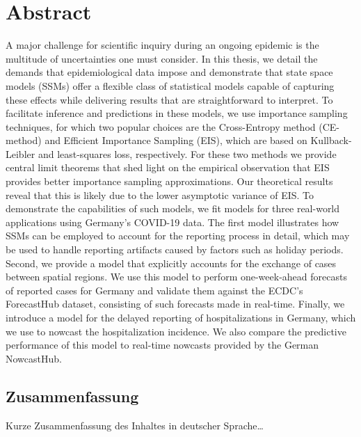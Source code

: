 \begingroup
\let\clearpage\relax
\let\cleardoublepage\relax
\let\cleardoublepage\relax

\chapter*{Abstract}
A major challenge for scientific inquiry during an ongoing epidemic is the multitude of uncertainties one must consider. 
In this thesis, we detail the demands that epidemiological data impose and demonstrate that state space models (SSMs) offer a flexible class of statistical models capable of capturing these effects while delivering results that are straightforward to interpret. 
To facilitate inference and predictions in these models, we use importance sampling techniques, for which two popular choices are the Cross-Entropy method (CE-method) and Efficient Importance Sampling (EIS), which are based on Kullback-Leibler and least-squares loss, respectively. For these two methods we provide central limit theorems that shed light on the empirical observation that EIS provides better importance sampling approximations. Our theoretical results reveal that this is likely due to the lower asymptotic variance of EIS. 
To demonstrate the capabilities of such models, we fit models for three real-world applications using Germany's COVID-19 data. 
The first model illustrates how SSMs can be employed to account for the reporting process in detail, which may be used to handle reporting artifacts caused by factors such as holiday periods.
Second, we provide a model that explicitly accounts for the exchange of cases between spatial regions. We use this model to perform one-week-ahead forecasts of reported cases for Germany and validate them against the ECDC's ForecastHub dataset, consisting of such forecasts made in real-time.
Finally, we introduce a model for the delayed reporting of hospitalizations in Germany, which we use to nowcast the hospitalization incidence. We also compare the predictive performance of this model to real-time nowcasts provided by the German NowcastHub.

\vfill

\begin{otherlanguage}{ngerman}
\chapter*{Zusammenfassung}
Kurze Zusammenfassung des Inhaltes in deutscher Sprache\dots
\end{otherlanguage}

\endgroup

\vfill